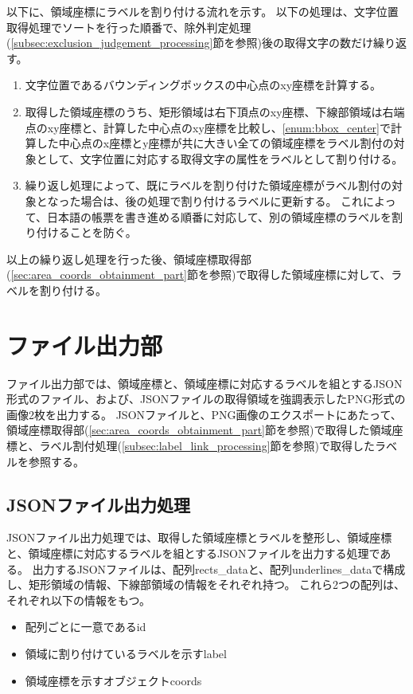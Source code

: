 以下に、領域座標にラベルを割り付ける流れを示す。
以下の処理は、文字位置取得処理でソートを行った順番で、除外判定処理(\ref{subsec:exclusion_judgement_processing}節を参照)後の取得文字の数だけ繰り返す。

\begin{enumerate}
    \item \label{enum:bbox_center} 文字位置であるバウンディングボックスの中心点のxy座標を計算する。
    \item 取得した領域座標のうち、矩形領域は右下頂点のxy座標、下線部領域は右端点のxy座標と、計算した中心点のxy座標を比較し、\ref{enum:bbox_center}で計算した中心点のx座標とy座標が共に大きい全ての領域座標をラベル割付の対象として、文字位置に対応する取得文字の属性をラベルとして割り付ける。
    \item 繰り返し処理によって、既にラベルを割り付けた領域座標がラベル割付の対象となった場合は、後の処理で割り付けるラベルに更新する。
          これによって、日本語の帳票を書き進める順番に対応して、別の領域座標のラベルを割り付けることを防ぐ。
\end{enumerate}

以上の繰り返し処理を行った後、領域座標取得部(\ref{sec:area_coords_obtainment_part}節を参照)で取得した領域座標に対して、ラベルを割り付ける。

\section{ファイル出力部}\label{subsec:file_output_part}
ファイル出力部では、領域座標と、領域座標に対応するラベルを組とするJSON形式のファイル、および、JSONファイルの取得領域を強調表示したPNG形式の画像2枚を出力する。
JSONファイルと、PNG画像のエクスポートにあたって、領域座標取得部(\ref{sec:area_coords_obtainment_part}節を参照)で取得した領域座標と、ラベル割付処理(\ref{subsec:label_link_processing}節を参照)で取得したラベルを参照する。

\subsection{JSONファイル出力処理}\label{subsec:json_file_output_processing}
JSONファイル出力処理では、取得した領域座標とラベルを整形し、領域座標と、領域座標に対応するラベルを組とするJSONファイルを出力する処理である。
出力するJSONファイルは、配列rects\_dataと、配列underlines\_dataで構成し、矩形領域の情報、下線部領域の情報をそれぞれ持つ。
これら2つの配列は、それぞれ以下の情報をもつ。

\begin{itemize}
    \item 配列ごとに一意であるid
    \item 領域に割り付けているラベルを示すlabel
    \item 領域座標を示すオブジェクトcoords
\end{itemize}

